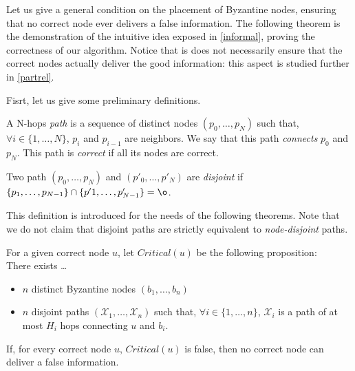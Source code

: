\documentclass[a4paper,11pt]{article}
\begin{document}
Let us give a general condition on the placement of Byzantine nodes, ensuring that no correct node ever delivers a false information.
The following theorem is the demonstration of the intuitive idea exposed in \ref{informal}, proving the correctness of our algorithm.
Notice that is does not necessarily ensure that the correct nodes actually deliver the good information: this aspect is studied further in \ref{partrel}.

Fisrt, let us give some preliminary definitions.

\begin{definition}[Path]
A N-hops \emph{path} is a sequence of distinct nodes $(p_0,\dots,p_N)$ such that, $\forall i \in \{1,\dots,N\}$, $p_i$ and $p_{i-1}$ are neighbors.
We say that this path \emph{connects} $p_0$ and $p_N$. This path is \emph{correct} if all its nodes are correct.
\end{definition}

\begin{definition}
\label{disjoint}
Two path $(p_0,\dots,p_N)$ and $(p'_0,\dots,p'_N)$ are \emph{disjoint} if $\{p_1,\dots,p_{N-1}\} \cap \{p'1,\dots,p'_{N-1}\} = \o$.
\end{definition}

This definition is introduced for the needs of the following theorems. Note that we do not claim that disjoint paths are strictly equivalent to \emph{node-disjoint} paths.


\begin{theorem}

\label{thsafe}
For a given correct node $u$, let $Critical(u)$ be the following proposition: \\There exists \dots
\begin{itemize}
\item $n$ distinct Byzantine nodes $(b_1,\dots,b_n)$
\item $n$ disjoint paths $(\mathcal{X}_1,\dots,\mathcal{X}_n)$ such that, $\forall i \in \{1,\dots,n\}$, $\mathcal{X}_i$ is a path of at most $H_i$ hops connecting $u$ and $b_i$.
\end{itemize}

If, for every correct node $u$, $Critical(u)$ is false, then no correct node can deliver a false information.
\end{theorem}
\end{document}
